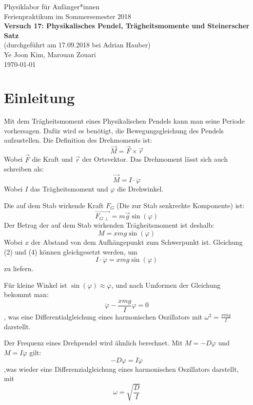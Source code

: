 \documentclass[11pt,a4paper]{article} %
\begin{document}
{
	\centering 
	\large 
	Physiklabor für Anfänger*innen \\
	Ferienpraktikum im Sommersemester 2018 \\[4mm]
	\textbf{\LARGE 
		Versuch 17: Physikalisches Pendel, Trägheitsmomente und Steinerscher Satz
	} \\[3mm]
	(durchgeführt am 17.09.2018 bei Adrian Hauber) \\
	Ye Joon Kim, Marouan Zouari\\
	\today \\[10mm]
}
\tableofcontents
\section{Einleitung}
Mit dem Trägheitsmoment eines Physikalischen Pendels kann man seine Periode vorhersagen. Dafür wird es benötigt, die Bewegungsgleichung des Pendels aufzustellen. Die Definition des Drehmoments ist:
\begin{equation}
\vec{M} = \vec{F}\times \vec{r}
\end{equation}
Wobei $\vec{F}$ die Kraft und $\vec{r}$ der Ortsvektor. Das Drehmoment lässt sich auch schreiben als:
\begin{equation}
\vec{M} = I \cdot \ddot{\varphi}
\end{equation}
Wobei $I$ das Trägheitsmoment und $\varphi$ die Drehwinkel. 

Die auf dem Stab wirkende Kraft $F_G$ (Die zur Stab  senkrechte Komponente) ist:
\begin{equation}
\vec{F_{G\perp}} = m\vec{g}\sin(\varphi)
\end{equation}
Der Betrag der auf dem Stab wirkenden Trägheitsmoment ist deshalb:
\begin{equation}
M = xmg\sin(\varphi)
\end{equation}
Wobei $x$ der Abstand von dem Aufhängepunkt zum Schwerpunkt ist. Gleichung (2) und (4) können gleichgesetzt werden, um
$$ I \cdot \ddot{\varphi} = xmg\sin(\varphi)$$ 
zu liefern. 

Für kleine Winkel ist $\sin(\varphi) \approx \varphi$, und nach Umformen der Gleichung bekommt man:
$$ \ddot{\varphi} - \frac{xmg}{I} \varphi = 0$$
, was eine Differentialgleichung eines harmonischen Oszillators mit $\omega^2 = \frac{xmg}{I}$ darstellt. 

Der Frequenz eines Drehpendel wird ähnlich berechnet. Mit $M = -D\varphi$ und $M = I\ddot{\varphi}$ gilt:
$$-D\varphi = I\ddot{\varphi}$$
,was wieder eine Differenzialgleichung eines harmonischen Oszillators darstellt, mit 
\begin{equation}
\omega = \sqrt{\frac{D}{I}}
\end{equation}
\end{document}
